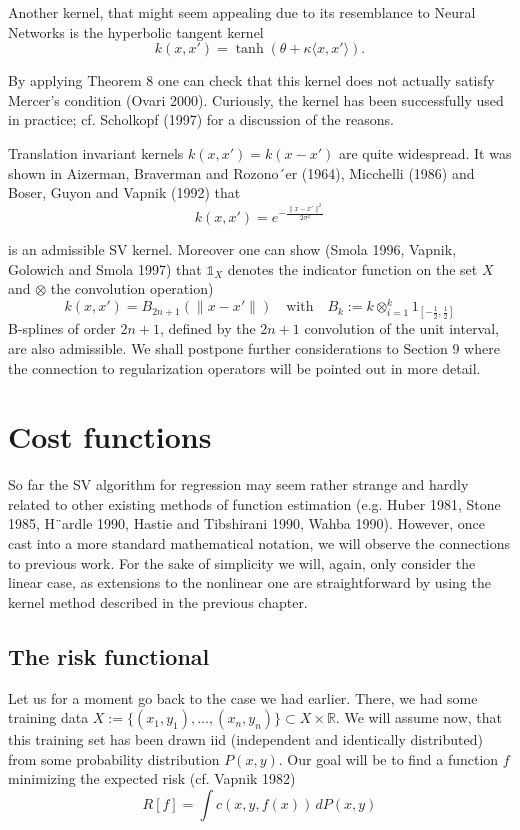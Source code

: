 \documentclass[fleqn,10pt]{olplainarticle}
\begin{document}
Another kernel, that might seem appealing due to its resemblance to Neural Networks is the hyperbolic tangent kernel
\[
k(x, x') = \tanh(\theta + \kappa \langle x, x' \rangle).
\]

By applying Theorem 8 one can check that this kernel does not actually satisfy Mercer’s condition (Ovari 2000). Curiously, the kernel has been successfully used in practice; cf. Scholkopf (1997) for a discussion of the reasons.

Translation invariant kernels \(k(x, x') = k(x - x')\) are quite widespread. It was shown in Aizerman, Braverman and Rozono´er (1964), Micchelli (1986) and Boser, Guyon and Vapnik (1992) that
\[
k(x, x') = e^{-\frac{\|x-x'\|^2}{2\sigma^2}}
\]

is an admissible SV kernel. Moreover one can show (Smola 1996, Vapnik, Golowich and Smola 1997) that \(\mathbb{1}_X\) denotes the indicator function on the set \(X\) and \(\otimes\) the convolution operation)
\[
k(x, x') = B_{2n+1}(\|x - x'\|) \quad \text{with} \quad B_k := k \otimes_{i=1}^k 1_{\left[-\frac{1}{2}, \frac{1}{2}\right]}
\]
B-splines of order \(2n + 1\), defined by the \(2n + 1\) convolution of the unit interval, are also admissible. We shall postpone further considerations to Section 9 where the connection to regularization operators will be pointed out in more detail.

\section{Cost functions}
So far the SV algorithm for regression may seem rather strange and hardly related to other existing methods of function estimation (e.g. Huber 1981, Stone 1985, H¨ardle 1990, Hastie and Tibshirani 1990, Wahba 1990). However, once cast into a more standard mathematical notation, we will observe the connections to previous work. For the sake of simplicity we will, again, only consider the linear case, as extensions to the nonlinear one are straightforward by using the kernel method described in the previous chapter.

\subsection{The risk functional}
Let us for a moment go back to the case we had earlier. There, we had some training data $X := \{(x_1, y_1), \ldots, (x_n, y_n)\} \subset X \times \mathbb{R}$. We will assume now, that this training set has been drawn iid
(independent and identically distributed) from some probability distribution $P(x, y)$. Our goal will be to find a function $f$ minimizing the expected risk (cf. Vapnik 1982)
\[ R[ f ] = \int c(x, y, f (x)) \, dP(x, y) \]
\end{document}
